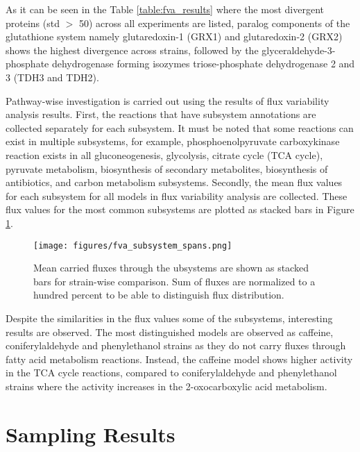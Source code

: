 As it can be seen in the Table \ref{table:fva_results} where the most divergent proteins (std $>$ 50) across all experiments are listed, paralog components of the glutathione system namely glutaredoxin-1 (GRX1) and glutaredoxin-2 (GRX2) shows the highest divergence across strains, followed by the glyceraldehyde-3-phosphate dehydrogenase forming isozymes triose-phosphate dehydrogenase 2 and 3 (TDH3 and TDH2).



Pathway-wise investigation is carried out using the results of flux variability analysis results. First, the reactions that have subsystem annotations are collected separately for each subsystem. It must be noted that some reactions can exist in multiple subsystems, for example, phosphoenolpyruvate carboxykinase reaction exists in all gluconeogenesis, glycolysis, citrate cycle (TCA cycle), pyruvate metabolism, biosynthesis of secondary metabolites, biosynthesis of antibiotics, and carbon metabolism subsystems. Secondly, the mean flux values for each subsystem for all models in flux variability analysis are collected. These flux values for the most common subsystems are plotted as stacked bars in Figure \ref{fig:fva_subsystem_spans}.

\begin{figure}[H]
  \begin{center}
  \texttt{[image: figures/fva\_subsystem\_spans.png]}
  \caption[Mean carried fluxes through the ubsystems are shown as stacked bars for strain-wise comparison. Sum of fluxes are normalized to a hundred percent to be able to distinguish flux distribution]{Mean carried fluxes through the ubsystems are shown as stacked bars for strain-wise comparison. Sum of fluxes are normalized to a hundred percent to be able to distinguish flux distribution.}
  \label{fig:fva_subsystem_spans}
  \end{center}
\end{figure}

Despite the similarities in the flux values some of the subsystems, interesting results are observed. The most distinguished models are observed as caffeine, coniferylaldehyde and phenylethanol strains as they do not carry fluxes through fatty acid metabolism reactions. Instead, the caffeine model shows higher activity in the TCA cycle reactions, compared to coniferylaldehyde and phenylethanol strains where the activity increases in the 2-oxocarboxylic acid metabolism.

\section{Sampling Results}

